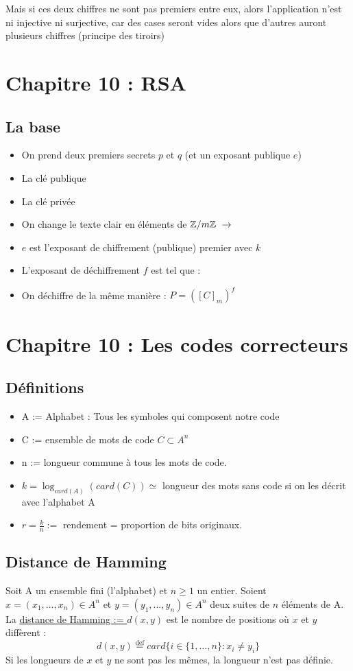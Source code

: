 \documentclass[11pt,a4paper]{article}
\renewcommand{\)}{\right)}
\renewcommand{\(}{\left(}
\begin{document}
Mais si ces deux chiffres ne sont pas premiers entre eux, alors l'application n'est ni injective ni surjective, car des cases seront vides alors que d'autres auront plusieurs chiffres (principe des tiroirs)
\section{Chapitre 10 : RSA}
\subsection{La base}
\begin{itemize}
	\item 	On prend deux premiers secrets $p$ et $q$ (et un exposant publique $e$)
	\item 	La clé publique 
	\item 	La clé privée 
	\item 	On change le texte clair en éléments de $\mathbb{Z}/m\mathbb{Z}\ \to$ 
	\item 	$e$ est l'exposant de chiffrement (publique) premier avec $k$
	\item 	L'exposant de déchiffrement $f$ est tel que : \fbox{$[f]_k = ([e]_k])^{-1}$}
	\item	On déchiffre de la même manière : $P = ([C]_m)^f$
\end{itemize}


\section[Les codes correcteurs]{Chapitre 10 : Les codes correcteurs}
\subsection{Définitions}
\begin{itemize}
	\item A := Alphabet : Tous les symboles qui composent notre code
	\item C := ensemble de mots de code $C \subset A^n$
	\item n := longueur commune à tous les mots de code.
	\item $k = \log_{card(A)}(card(C)) \simeq$ longueur des mots sans code si on les décrit avec l'alphabet A
	\item $r = \frac{k}{n} :=$ rendement = proportion de bits originaux.
\end{itemize}
\subsection{Distance de Hamming}
Soit A un ensemble fini (l'alphabet) et $n \geq 1$ un entier. Soient $x = (x_1,\ldots,x_n) \in A^n$ et $y = (y_1,\ldots,y_n) \in A^n$ deux suites de $n$ éléments de A. La \uline{distance de Hamming := $d(x,y)$} est le nombre de positions où $x$ et $y$ diffèrent :
\begin{equation*}
	d(x,y) \overset{\text{def}}{=} card\{i \in \{1,\ldots,n\} : x_i \neq y_i \}
\end{equation*}
Si les longueurs de $x$ et $y$ ne sont pas les mêmes, la longueur n'est pas définie.
\end{document}
